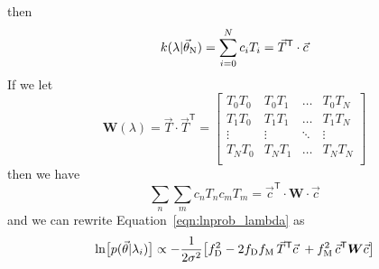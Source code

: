 \documentclass[preprint]{aastex} %
\newcommand{\vt}{\vec{\theta}}
\newcommand{\vN}{\vt_{\rm N}}
\newcommand{\vc}{\vec{c}}
\newcommand{\fM}{f_{\rm M}}
\newcommand{\fD}{f_{\rm D}}
\newcommand{\trans}{\mathsf{T}}
\begin{document}
then 
\begin{equation}
  k(\lambda | \vN) = \sum^N_{i = 0} c_i T_i = \vec{T}^\trans \cdot \vc
\end{equation}
If we let 
\begin{equation}
  {\bm W}(\lambda) = \vec{T} \cdot \vec{T}^\trans = 
  \begin{bmatrix}
T_0 T_0 & T_0 T_1 &  \hdots & T_0 T_N \\
T_1 T_0 & T_1 T_1 &  \hdots & T_1 T_N \\
\vdots  & \vdots  &  \ddots & \vdots \\
T_N T_0 & T_N T_1 &  \hdots & T_N T_N \\
  \end{bmatrix}
\end{equation}
then we have
\begin{equation}
  \sum_n \sum_m c_n T_n c_m T_m = \vc^\trans \cdot {\bm W} \cdot \vc
\end{equation}
and we can rewrite Equation~\ref{eqn:lnprob_lambda} as 
\begin{equation}
  \ln \bigl [p(\vt | \lambda_i) \bigr] \propto -\frac{1}{2 \sigma^2} \bigl [ \fD^2 - 2 \fD \fM\, \vec{T}^\trans \vc \; + \fM^2 \, \vc^\trans {\bm W}  \vc \bigr ]
\end{equation}
\end{document}
